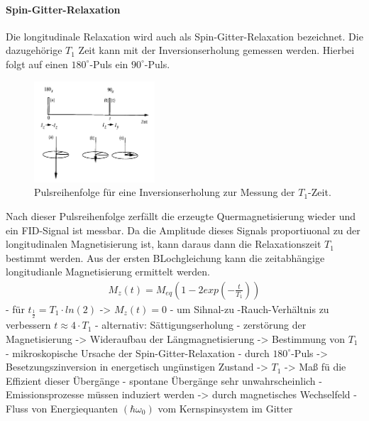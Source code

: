 \paragraph{Spin-Gitter-Relaxation}
Die longitudinale Relaxation wird auch als Spin-Gitter-Relaxation bezeichnet.
Die dazugeh\"{o}rige $T_1$ Zeit kann mit der Inversionserholung gemessen werden.
Hierbei folgt auf einen $180^{\circ}$-Puls ein $90^{\circ}$-Puls.
\begin{figure}[hbtp]
	\centering
	\includegraphics[width=0.4\textwidth]{Plots/inversionserholung.png}
	\caption{Pulsreihenfolge f\"{u}r eine Inversionserholung zur Messung der $T_1$-Zeit.}
	\label{inversion}
\end{figure}
Nach dieser Pulsreihenfolge zerf\"{a}llt die erzeugte Quermagnetisierung wieder und ein FID-Signal ist messbar.
Da die Amplitude dieses Signals proportiuonal zu der longitudinalen Magnetisierung ist, kann daraus dann die Relaxationszeit $T_1$ bestimmt werden.
Aus der ersten BLochgleichung kann die zeitabh\"{a}ngige longitudianle Magnetisierung ermittelt werden.
\begin{align}
	M_z(t) = M_{eq} \left(1 - 2 exp\left( - \frac{t}{T_1} \right) \right)
\end{align}
- f\"{u}r $t_{\frac{1}{2}} = T_1 \cdot ln(2)$ -> $M_z(t) = 0$
- um Sihnal-zu -Rauch-Verh\"{a}ltnis zu verbessern $t \approx 4 \cdot T_1$
- alternativ: S\"{a}ttigungserholung
- zerst\"{o}rung der Magnetisierung -> Wideraufbau der L\"{a}ngmagnetisierung -> Bestimmung von $T_1$
- mikroskopische Ursache der Spin-Gitter-Relaxation
- durch $180^{\circ}$-Puls -> Besetzungszinversion in energetisch ung\"{u}nstigen Zustand
-> $T_1$ -> Ma{\ss} f\"{u} die Effizient dieser \"{U}berg\"{a}nge
- spontane \"{U}berg\"{a}nge sehr unwahrscheinlich
- Emissionsprozesse m\"{u}ssen induziert werden -> durch magnetisches Wechselfeld
- Fluss von Energiequanten $(\hbar \omega_0)$ vom Kernspinsystem im Gitter

